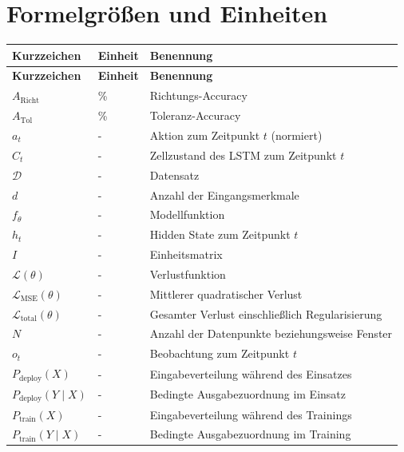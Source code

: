 \section*{Formelgr\"o\ss en und Einheiten}

\begingroup
\renewcommand{\arraystretch}{1.5}
\begin{longtable}{@{} >{\raggedright\arraybackslash}p{4.0cm} >{\raggedright\arraybackslash}p{2.5cm} >{\raggedright\arraybackslash}p{9.5cm} @{}}
        \textbf{Kurzzeichen} & \textbf{Einheit} & \textbf{Benennung} \\ \hline
        \endfirsthead
        \textbf{Kurzzeichen} & \textbf{Einheit} & \textbf{Benennung} \\ \hline
        \endhead
        $A_{\mathrm{Richt}}$ & \% & Richtungs-Accuracy \\
        $A_{\mathrm{Tol}}$ & \% & Toleranz-Accuracy \\
        $a_t$ & - & Aktion zum Zeitpunkt $t$ (normiert) \\
        $C_t$ & - & Zellzustand des LSTM zum Zeitpunkt $t$ \\
        $\mathcal{D}$ & - & Datensatz \\
        $d$ & - & Anzahl der Eingangsmerkmale \\
        $f_\theta$ & - & Modellfunktion \\
        $h_t$ & - & Hidden State zum Zeitpunkt $t$ \\
        $I$ & - & Einheitsmatrix \\
        $\mathcal{L}(\theta)$ & - & Verlustfunktion \\
        $\mathcal{L}_{\mathrm{MSE}}(\theta)$ & - & Mittlerer quadratischer Verlust \\
        $\mathcal{L}_{\mathrm{total}}(\theta)$ & - & Gesamter Verlust einschlie\ss lich Regularisierung \\
        $N$ & - & Anzahl der Datenpunkte beziehungsweise Fenster \\
        $o_t$ & - & Beobachtung zum Zeitpunkt $t$ \\
        $P_{\mathrm{deploy}}(X)$ & - & Eingabeverteilung w\"ahrend des Einsatzes \\
        $P_{\mathrm{deploy}}(Y\mid X)$ & - & Bedingte Ausgabezuordnung im Einsatz \\
        $P_{\mathrm{train}}(X)$ & - & Eingabeverteilung w\"ahrend des Trainings \\
        $P_{\mathrm{train}}(Y\mid X)$ & - & Bedingte Ausgabezuordnung im Training \\

\end{longtable}
